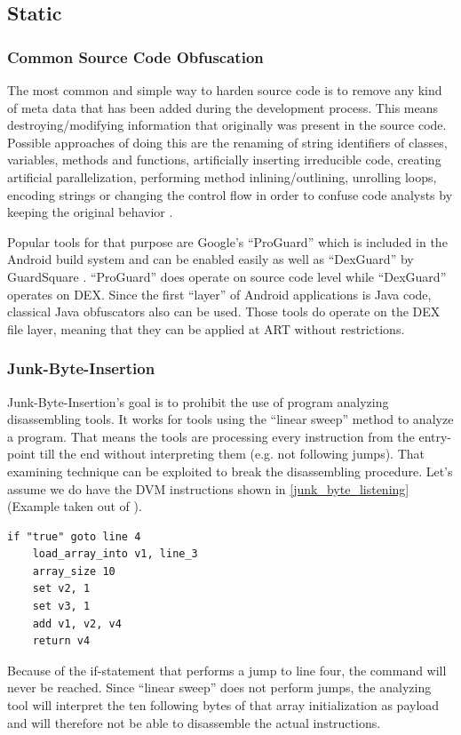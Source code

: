 \subsection{Static}
\subsubsection{Common Source Code Obfuscation}
The most common and simple way to harden source code is to remove any kind of meta data
that has been added during the development process. This means destroying/modifying
information that originally was present in the source code.
Possible approaches of doing this are the renaming of string identifiers of
classes, variables, methods and functions, artificially inserting
irreducible code, creating artificial parallelization, performing method inlining/outlining, unrolling loops, encoding strings or changing the control flow in order to confuse code analysts by keeping the original behavior
\parencite[p.87]{lvl_imp}.

Popular tools for that purpose are Google's ``ProGuard''
\parencite{proguardtool} which is included in the Android build system and
can be enabled easily as well as ``DexGuard'' by GuardSquare
\parencite{dexguardtool}. ``ProGuard'' does
operate on source code level while ``DexGuard'' operates on DEX.
Since the first ``layer'' of Android applications is Java code, classical Java
obfuscators also can be used.
Those tools do operate on the DEX file layer, meaning that they can be applied at ART without restrictions.

\subsubsection{Junk-Byte-Insertion}
Junk-Byte-Insertion's goal is to prohibit the use of program analyzing
disassembling tools. It works for tools using the
``linear sweep'' method to analyze a program. That means
the tools are processing every instruction from the entry-point
till the end without interpreting them (e.g. not following jumps).
That examining technique can be exploited to break the disassembling
procedure. Let's assume we do have the DVM instructions shown in \autoref{junk_byte_listening}(Example taken out of \parencite[p.67]{lvl_imp}).
  \begin{lstlisting}[language={[x64]Assembler}, caption=Junk-Byte-Insertion, label=junk_byte_listening]
    if "true" goto line 4
    load_array_into v1, line_3
    array_size 10
    set v2, 1
    set v3, 1
    add v1, v2, v4
    return v4
  \end{lstlisting}
Because of the if-statement that performs a jump to line four, the  command will never be reached.
Since ``linear sweep'' does not perform jumps, the analyzing tool
will interpret the ten following bytes of that array initialization as payload and will therefore not be able to disassemble the actual instructions.

